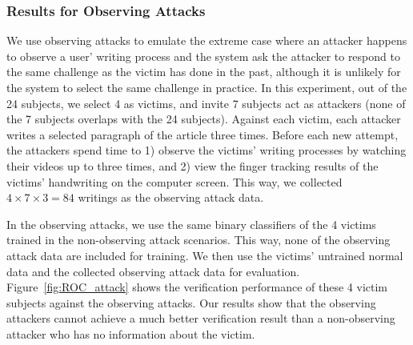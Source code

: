 

%

\subsubsection{Results for Observing Attacks}


We use observing attacks to emulate the extreme case where an attacker happens to observe a user' writing process and the system ask the attacker to respond to the same challenge as the victim has done in the past, although it is unlikely for the system to select the same challenge in practice.  In this experiment, out of the 24 subjects, we  select 4 as victims, and invite 7 subjects act as attackers (none of the 7 subjects overlaps with the 24 subjects). Against each victim, each attacker writes a selected paragraph of the article three times. Before each new attempt, the attackers spend time to 1) observe the victims' writing processes by watching their videos up to three times, 
and 2) view the finger tracking results of the victims' handwriting on the computer screen. This way, we collected $4\times 7 \times 3=84$ writings as the observing attack data. 

In the observing attacks, we use the same binary classifiers of the 4 victims trained in the non-observing attack scenarios. This way, none of the observing attack data are included for training. We then use the victims' untrained normal data and the collected observing attack data for evaluation. Figure~\ref{fig:ROC_attack} shows the verification performance of these 4 victim subjects against the observing attacks. Our results show that the observing attackers cannot achieve a much better verification result than a non-observing attacker who has no information about the victim.  



